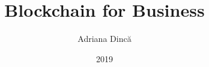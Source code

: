 \title{Blockchain for Business}
\author{Adriana Dincă}
\date{2019}



\newcommand{\project}{Envision Blockchain for your Business}

